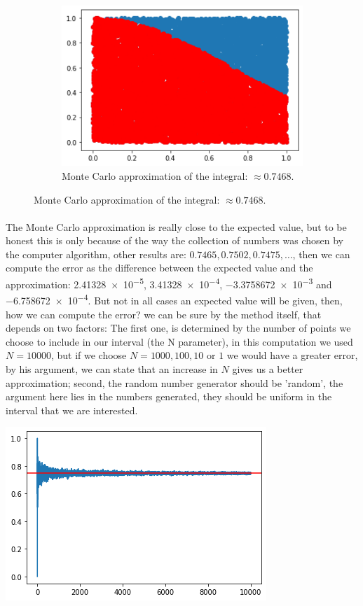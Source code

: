 \documentclass{article}
\begin{document}
\begin{figure}[h!]
	\begin{subfigure}[b]{0.45\linewidth}
		\includegraphics[width=\linewidth]{fn_monte_carlo.png}
		\caption{Monte Carlo approximation of the integral: $\approx 0.7468$.}
	\end{subfigure}
\end{figure}
\paragraph{} The Monte Carlo approximation is really close to the expected value, but to be honest this is only because of the way the collection of numbers was chosen by the computer algorithm, other results are: $0.7465, 0.7502, 0.7475, \dots$, then we can compute the error as the difference between the expected value and the approximation: \num{2.41328e-5}, \num{3.41328e-4}, \num{-3.3758672e-3} and \num{-6.758672e-4}. But not in all cases an expected value will be given, then, how we can compute the error? we can be sure by the method itself, that depends on two factors: The first one, is determined by the number of points we choose to include in our interval (the N parameter), in this computation we used $N=10000$, but if we choose $N=1000,100, 10$ or $1$ we would have a greater error, by his argument, we can state that an increase in $N$ gives us a better approximation; second, the random number generator should be 'random', the argument here lies in the numbers generated, they should be uniform in the interval that we are interested.
\begin{center}
	\includegraphics[width=0.7\linewidth]{error_convergence.png}
\end{center}
\end{document}
